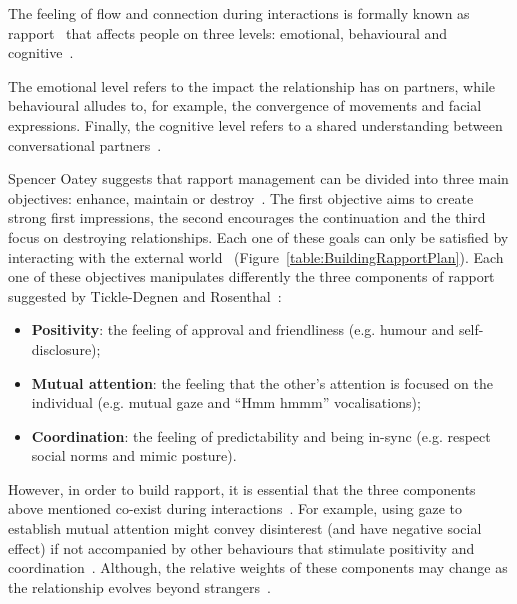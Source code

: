 \label{chap:rapport}


The feeling of flow and connection during interactions is formally known as rapport~\cite{Wang2009} that affects people on three levels: emotional, behavioural and cognitive~\cite{Wang2009}.

The emotional level refers to the impact the relationship has on partners, while behavioural alludes to, for example, the convergence of movements and facial expressions. Finally, the cognitive level refers to a shared understanding between conversational partners~\cite{Wang2009}.

Spencer Oatey suggests that rapport management can be divided into three main objectives: enhance, maintain or destroy~\cite{Spencer-Oatey2005}. The first objective aims to create strong first impressions, the second encourages the continuation and the third focus on destroying relationships. Each one of these goals can only be satisfied by interacting with the external world~\cite{Papangelis2014, Zhao2014} (Figure~\ref{table:BuildingRapportPlan}). Each one of these objectives manipulates differently the three components of rapport suggested by Tickle-Degnen and Rosenthal~\cite{Tickle-Degnen1990}:

\begin{itemize}
	\item \textbf{Positivity}: the feeling of approval and friendliness (e.g. humour and self-disclosure);
	\item \textbf{Mutual attention}: the feeling that the other's attention is focused on the individual (e.g. mutual gaze and ``Hmm hmmm'' vocalisations);
	\item \textbf{Coordination}: the feeling of predictability and being in-sync (e.g. respect social norms and mimic posture).
\end{itemize}

However, in order to build rapport, it is essential that the three components above mentioned co-exist during interactions~\cite{Grahe1999, Wang2010, Zhao2014, Cassell2007}. For example, using gaze to establish mutual attention might convey disinterest (and have negative social effect) if not accompanied by other behaviours that stimulate positivity and coordination~\cite{Wang2010}. Although, the relative weights of these components may change as the relationship evolves beyond strangers~\cite{Wang2010, Zhao2014, Cassell2007}.

